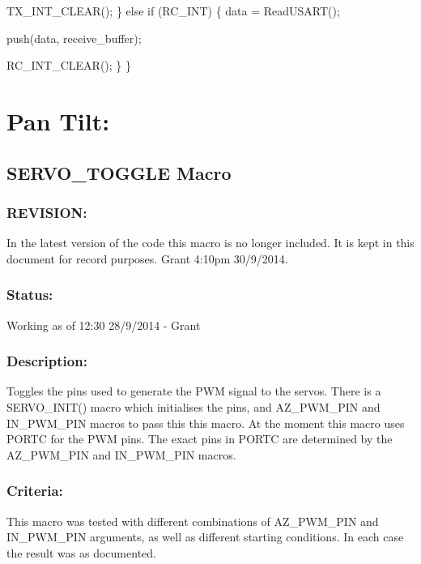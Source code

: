 \documentclass[]{article}
\begin{document}
		TX\_INT\_CLEAR(); \newline
	\} \newline
	else if (RC\_INT) \newline
	\{ \newline
		data = ReadUSART(); \newline
		
		push(data, receive\_buffer); \newline
		
		RC\_INT\_CLEAR(); \newline
	\} \newline
\} \newline

\section{Pan Tilt:}

\subsection{SERVO\_TOGGLE Macro}

\subsubsection{REVISION:}
In the latest version of the code this macro is no longer included. It is kept in this document for record purposes. Grant 4:10pm 30/9/2014.

\subsubsection{Status:}
Working as of 12:30 28/9/2014 - Grant

\subsubsection{Description:}
Toggles the pins used to generate the PWM signal to the servos. There is a SERVO\_INIT() macro which initialises the pins, and AZ\_PWM\_PIN and IN\_PWM\_PIN macros to pass this this macro. At the moment this macro uses PORTC for the PWM pins. The exact pins in PORTC are determined by the AZ\_PWM\_PIN and IN\_PWM\_PIN macros.

\subsubsection{Criteria:}
This macro was tested with different combinations of AZ\_PWM\_PIN and IN\_PWM\_PIN arguments, as well as different starting conditions. In each case the result was as documented.
\end{document}

